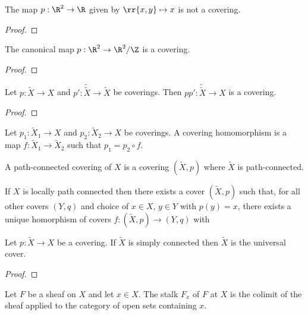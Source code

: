 \documentclass{article}
\begin{document}
\begin{example}
  The map $p:\R^2\to\R$ given by $\rr{x,y}\mapsto x$ is not a covering.
  \begin{proof}
    \missingproof
  \end{proof}
\end{example}

\begin{example}
  The canonical map $p:\R^2\to\R^2/\Z$ is a covering.
  \begin{proof}
    \missingproof
  \end{proof}
\end{example}

\begin{proposition}
  Let $p:\tilde X\to X$ and $p':\tilde{\tilde X}\to\tilde X$ be coverings.
  Then $pp':\tilde{\tilde{X}}\to X$ is a covering.
  \begin{proof}
    \missingproof
  \end{proof}
\end{proposition}

\begin{definition}
  Let $p_1:\tilde X_1\to X$ and $p_2:\tilde X_2\to X$ be coverings. A covering homomorphism
  is a map $f:\tilde X_1\to\tilde X_2$ such that $p_1 = p_2\circ f$.
\end{definition}

\begin{definition}
  A path-connected covering of $X$ is a covering $(\tilde X,p)$ where $\tilde X$ is
  path-connected.
\end{definition}

\begin{theorem}
  If $X$ is locally path connected then there exists a cover
  $(\tilde X,p)$ such that, for all other covers $(Y,q)$ and choice of $x\in X$, $y\in Y$
  with $p(y)=x$, there exists a unique homorphism of covers $f:(\tilde X,p)\to(Y,q)$
  with \missingdef
\end{theorem}

\begin{theorem}
  Let $p:\tilde X\to X$ be a covering. If $\tilde X$ is simply connected then
  $\tilde X$ is the universal cover.
  \begin{proof}
    \missingproof
  \end{proof}
\end{theorem}

\begin{definition}
  Let $F$ be a sheaf on $X$ and let $x\in X$. The stalk $F_x$ of $F$ at $X$ is the
  colimit of the sheaf applied to the category of open sets containing $x$.
\end{definition}
\end{document}
